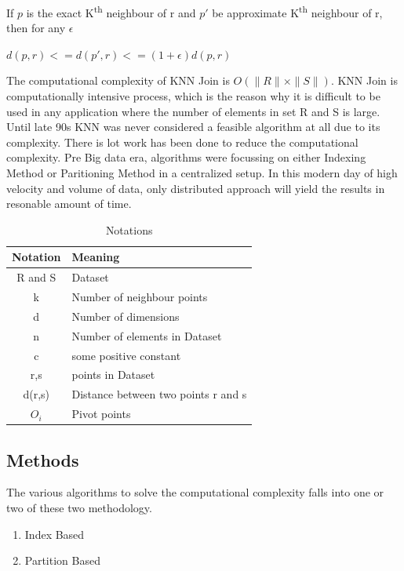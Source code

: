 \documentclass[conference]{IEEEtran}
\begin{document}
If $p$ is the exact K\textsuperscript{th} neighbour of r and $p'$ be approximate
K\textsuperscript{th} neighbour of r, then for any $\epsilon$

\bigskip

$d(p,r) <= d(p',r) <= (1+\epsilon) d(p,r)$

\bigskip

The computational complexity of KNN Join is
$O(\|R\| \times \|S\|)$. KNN Join is computationally intensive process, which
is the reason why it is difficult to be used in any application where
the number of elements in set R and S is large. Until late 90s KNN was
never considered a feasible algorithm at all due to its
complexity. There is lot work has been done to reduce the
computational complexity. Pre Big data era, algorithms were focussing
on either Indexing Method or Paritioning Method in a centralized
setup. In this modern day of high velocity and volume of data, only distributed
approach will yield the results in resonable amount of time.

\bigskip

\begin{table}[!t]
\caption{Notations}
\label{notations}
\centering
\begin{tabular}{|c|l|}
\hline
Notation & Meaning \\
\hline
R and S & Dataset\\

k & Number of neighbour points \\

d & Number of dimensions \\

n & Number of elements in Dataset \\

c & some positive constant \\

r,s & points in Dataset \\

d(r,s) & Distance between two points r and s \\

$O_i$ & Pivot points \\

\hline
\end{tabular}
\end{table}

\subsection{Methods}
The various algorithms to solve the computational complexity
falls into one or two of these two methodology.
\begin{enumerate}
\item Index Based
\item Partition Based
\end{enumerate}
\end{document}
